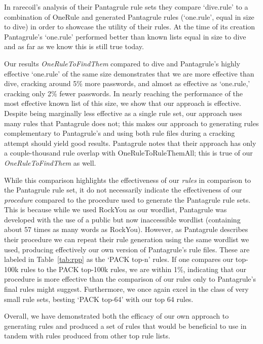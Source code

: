 \documentclass{article}
\begin{document}
In rarecoil's analysis of their Pantagrule rule sets
they compare `dive.rule' to a combination of OneRule and generated Pantagrule
rules (`one.rule', equal in size to dive) in order to showcase the utility of their
rules. At the time of its creation Pantagrule's `one.rule' performed better than
known lists equal in size to dive and as far as we know this is still true today.

Our results \textit{OneRuleToFindThem} compared to dive and Pantagrule's highly
effective `one.rule' of the same size demonstrates that we are
more effective than dive, cracking around 5\% more passwords, and almost as effective
as `one.rule,' cracking only 2\% fewer passwords. In nearly reaching the
performance of
the most effective known list of this size, we show that our approach is
effective. Despite being marginally less effective as a single rule set, our approach
uses many rules that Pantagrule does not; this makes our approach to generating
rules complementary to Pantagrule's and using both rule files during a cracking
attempt should yield good results. Pantagrule notes that their approach has only
a couple-thousand rule overlap with OneRuleToRuleThemAll; this is true
of our \textit{OneRuleToFindThem} as well.

While this comparison highlights the effectiveness of our \textit{rules} in
comparison to the Pantagrule rule set, it do not necessarily indicate the
effectiveness of our \textit{procedure} compared to the procedure used to
generate the Pantagrule rule sets. This is because while we used RockYou as our
wordlist, Pantagrule was developed with the use of a public but now
inaccessible wordlist (containing about 57 times as many words as RockYou).
However, as Pantagrule describes their procedure we can
repeat their rule generation using the same wordlist we used, producing
effectively our own version of Pantagrule's rule files. These are labeled in
Table~\ref{tab:rpp} as the `PACK top-n' rules. If one compares our top-100k
rules
to the PACK top-100k rules, we are within 1\%, indicating that our procedure
is more effective than the comparison of our rules only to Pantagrule's final
rules might suggest. Furthermore, we once again excel in the class of very
small rule sets, besting `PACK top-64' with our top 64 rules.

Overall, we have demonstrated both the efficacy of our
own approach to generating rules and produced a set of rules that would be
beneficial to use in tandem with rules produced from other top rule lists.
\end{document}
